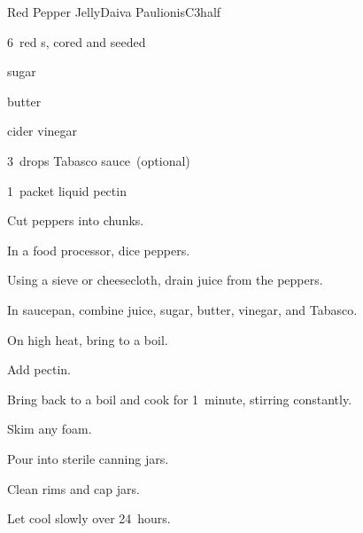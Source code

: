 \begin{recipe}{Red Pepper Jelly}{Daiva Paulionis}{C{3half}}

\begin{ingredients}
\item 6~red s, cored and seeded
\item {} sugar
\item \tp{\eighth} butter
\item \C{\half} cider vinegar
\item 3~drops Tabasco sauce~(optional)
\item 1~packet liquid pectin
\end{ingredients}

\begin{directions}
\item Cut peppers into chunks.
\item In a food processor, dice peppers.
\item Using a sieve or cheesecloth, drain  juice from the peppers.
\item In saucepan, combine juice, sugar, butter, vinegar, and Tabasco.
\item On high heat, bring to a boil.
\item Add pectin.
\item Bring back to a boil and cook for 1~minute, stirring constantly.
\item Skim any foam.
\item Pour into sterile canning jars.
\item Clean rims and cap jars.
\item Let cool slowly over 24~hours.
\end{directions}

\end{recipe}
